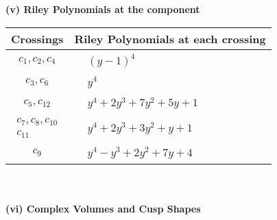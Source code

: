\documentclass[1p]{elsarticle_modified}
\theoremstyle{definition}
\begin{document}
\newpage\renewcommand{\arraystretch}{1}
\flushleft \textbf{(v) Riley Polynomials at the component}\newline \\
\begin{tabular}{m{50pt}|m{274pt}}
Crossings & \hspace{64pt}Riley Polynomials at each crossing \\
\hline $$\begin{aligned}c_{1},c_{2},c_{4}\end{aligned}$$&$\begin{aligned}
&(y-1)^4
\end{aligned}$\\
\hline $$\begin{aligned}c_{3},c_{6}\end{aligned}$$&$\begin{aligned}
&y^4
\end{aligned}$\\
\hline $$\begin{aligned}c_{5},c_{12}\end{aligned}$$&$\begin{aligned}
&y^4+2 y^3+7 y^2+5 y+1
\end{aligned}$\\
\hline $$\begin{aligned}c_{7},c_{8},c_{10}\\c_{11}\end{aligned}$$&$\begin{aligned}
&y^4+2 y^3+3 y^2+y+1
\end{aligned}$\\
\hline $$\begin{aligned}c_{9}\end{aligned}$$&$\begin{aligned}
&y^4- y^3+2 y^2+7 y+4
\end{aligned}$\\
\hline
\end{tabular}\\~\\
\newpage\flushleft \textbf{(vi) Complex Volumes and Cusp Shapes}
\end{document}
